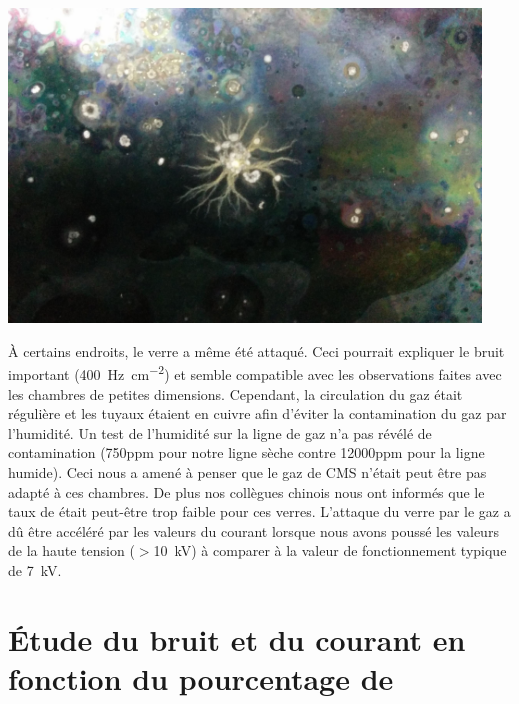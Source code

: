 \begin{minipage}[th!]{1\textwidth}
\begin{minipage}[th!]{0.48\textwidth}
\begin{minipage}[th!]{1\textwidth}
			\label{perle}
		\end{minipage}%
		\\
		\begin{minipage}[th!]{1\textwidth}
			\noindent
			\centering
			\includegraphics[width=0.94\textwidth]{GLA/depot2.jpg}
			\label{depot2}
		\end{minipage}%
	\end{minipage}%
	\addtocounter{figure}{-1}
	\label{probs}
\end{minipage}%

 À certains endroits, le verre a même été attaqué. Ceci pourrait expliquer le bruit important (\SI{400}{\hertz\per\square\centi\meter}) et semble compatible avec les observations faites avec les chambres de petites dimensions. Cependant, la circulation du gaz était régulière et les tuyaux étaient en cuivre afin d'éviter la contamination du gaz par l'humidité. Un test de l'humidité sur la ligne de gaz n'a pas révélé de contamination (\num{750}ppm pour notre ligne sèche contre \num{12000}ppm pour la ligne humide). Ceci nous a amené à penser que le gaz de CMS n'était peut être pas adapté à ces chambres. De plus nos collègues chinois nous ont informés que le taux de  était peut-être trop faible pour ces verres. L'attaque du verre par le gaz a dû être accéléré par les valeurs du courant lorsque nous avons poussé les valeurs de la haute tension ($>$\SI{10}{\kilo\volt}) à comparer à la valeur de fonctionnement typique de \SI{7}{\kilo\volt}.
 
 \section{Étude du bruit et du courant en fonction du pourcentage de \texorpdfstring{}{SF6}}
 
